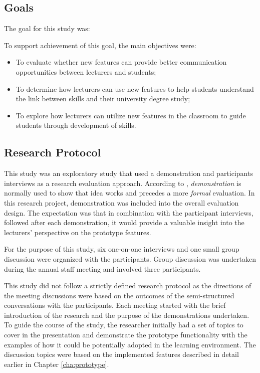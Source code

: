 \subsection{Goals}

The goal for this study was:


To support achievement of this goal, the main objectives were:

\begin{itemize}
  \item To evaluate whether new features can provide better communication
  opportunities between lecturers and students;
  \item To determine how lecturers can use new features to help students
  understand the link between \LLLs skills and their university degree study;
  \item To explore how lecturers can utilize new features in the classroom to
  guide students through development of \LLLs skills. 
\end{itemize}

\subsection{Research Protocol}

This study was an exploratory study that used a demonstration and participants
interviews as a research evaluation approach. According to \citet{Peffers2008},
\textit{demonstration} is normally used to show that idea works and precedes a
more \textit{formal} evaluation. In this research project, demonstration was
included into the overall evaluation design. The expectation was that in
combination with the participant interviews, followed after each demonstration,
it would provide a valuable insight into the lecturers' perspective on the
prototype features.

For the purpose of this study, six one-on-one interviews and one small group
discussion were organized with the participants. Group discussion was undertaken
during the annual staff meeting and involved three participants.

This study did not follow a strictly defined research protocol as the directions
of the meeting discussions were based on the outcomes of the semi-structured
conversations with the participants. Each meeting started with the brief
introduction of the research and the purpose of the demonstrations undertaken.
To guide the course of the study, the researcher initially had a set of topics
to cover in the presentation and demonstrate the prototype functionality with
the examples of how it could be potentially adopted in the learning environment.
The discussion topics were based on the implemented features described in detail
earlier in Chapter \ref{cha:prototype}.


